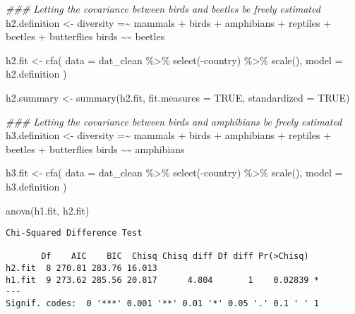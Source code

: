 \documentclass[
  letterpaper,
  DIV=11,
  numbers=noendperiod]{scrreprt}
\newenvironment{Shaded}{\begin{snugshade}}{\end{snugshade}}
\newcommand{\AttributeTok}[1]{\textcolor[rgb]{0.40,0.45,0.13}{#1}}
\newcommand{\ConstantTok}[1]{\textcolor[rgb]{0.56,0.35,0.01}{#1}}
\newcommand{\DocumentationTok}[1]{\textcolor[rgb]{0.37,0.37,0.37}{\textit{#1}}}
\newcommand{\FunctionTok}[1]{\textcolor[rgb]{0.28,0.35,0.67}{#1}}
\newcommand{\NormalTok}[1]{\textcolor[rgb]{0.00,0.23,0.31}{#1}}
\newcommand{\OtherTok}[1]{\textcolor[rgb]{0.00,0.23,0.31}{#1}}
\newcommand{\SpecialCharTok}[1]{\textcolor[rgb]{0.37,0.37,0.37}{#1}}
\newcommand{\StringTok}[1]{\textcolor[rgb]{0.13,0.47,0.30}{#1}}
\begin{document}
\begin{Shaded}
\begin{Highlighting}[]
\DocumentationTok{\#\#\# Letting the covariance between birds and beetles be freely estimated}
\NormalTok{h2.definition }\OtherTok{\textless{}{-}} 
\StringTok{\textquotesingle{}diversity =\textasciitilde{} mammals + birds + amphibians + }
\StringTok{              reptiles + beetles + butterflies}
\StringTok{ }
\StringTok{ birds \textasciitilde{}\textasciitilde{} beetles\textquotesingle{}}


\NormalTok{h2.fit }\OtherTok{\textless{}{-}} \FunctionTok{cfa}\NormalTok{(}
  \AttributeTok{data  =}\NormalTok{ dat\_clean }\SpecialCharTok{\%\textgreater{}\%} \FunctionTok{select}\NormalTok{(}\SpecialCharTok{{-}}\NormalTok{country) }\SpecialCharTok{\%\textgreater{}\%} \FunctionTok{scale}\NormalTok{(),}
  \AttributeTok{model =}\NormalTok{ h2.definition}
\NormalTok{)}

\NormalTok{h2.summary }\OtherTok{\textless{}{-}} \FunctionTok{summary}\NormalTok{(h2.fit, }\AttributeTok{fit.measures =} \ConstantTok{TRUE}\NormalTok{, }\AttributeTok{standardized =} \ConstantTok{TRUE}\NormalTok{)}

\DocumentationTok{\#\#\# Letting the covariance between birds and amphibians be freely estimated}
\NormalTok{h3.definition }\OtherTok{\textless{}{-}} 
  \StringTok{\textquotesingle{}diversity =\textasciitilde{} mammals + birds + amphibians + }
\StringTok{              reptiles + beetles + butterflies}
\StringTok{ }
\StringTok{ birds \textasciitilde{}\textasciitilde{} amphibians\textquotesingle{}}


\NormalTok{h3.fit }\OtherTok{\textless{}{-}} \FunctionTok{cfa}\NormalTok{(}
 \AttributeTok{data  =}\NormalTok{ dat\_clean }\SpecialCharTok{\%\textgreater{}\%} \FunctionTok{select}\NormalTok{(}\SpecialCharTok{{-}}\NormalTok{country) }\SpecialCharTok{\%\textgreater{}\%} \FunctionTok{scale}\NormalTok{(),}
  \AttributeTok{model =}\NormalTok{ h3.definition}
\NormalTok{)}

\FunctionTok{anova}\NormalTok{(h1.fit, h2.fit)}
\end{Highlighting}
\end{Shaded}

\begin{verbatim}
Chi-Squared Difference Test

       Df    AIC    BIC  Chisq Chisq diff Df diff Pr(>Chisq)  
h2.fit  8 270.81 283.76 16.013                                
h1.fit  9 273.62 285.56 20.817      4.804       1    0.02839 *
---
Signif. codes:  0 '***' 0.001 '**' 0.01 '*' 0.05 '.' 0.1 ' ' 1
\end{verbatim}
\end{document}
